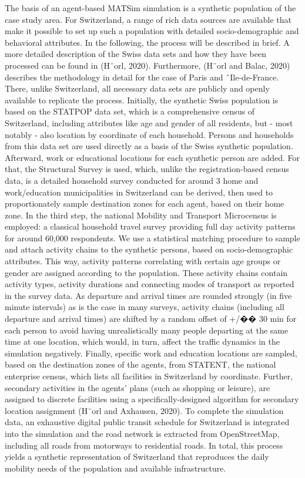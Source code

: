 The basis of an agent-based MATSim simulation is a synthetic population of the case study area. For Switzerland, a range of rich
data sources are available that make it possible to set up such a population with detailed socio-demographic and behavioral attributes.
In the following, the process will be described in brief. A more detailed description of the Swiss data sets and how they have been
processed can be found in (H¨orl, 2020). Furthermore, (H¨orl and Balac, 2020) describes the methodology in detail for the case of Paris
and ˆIle-de-France. There, unlike Switzerland, all necessary data sets are publicly and openly available to replicate the process.
Initially, the synthetic Swiss population is based on the STATPOP data set, which is a comprehensive census of Switzerland,
including attributes like age and gender of all residents, but - most notably - also location by coordinate of each household. Persons and
households from this data set are used directly as a basis of the Swiss synthetic population. Afterward, work or educational locations for
each synthetic person are added. For that, the Structural Survey is used, which, unlike the registration-based census data, is a detailed
household survey conducted for around 3%
home and work/education municipalities in Switzerland can be derived, then used to proportionately sample destination zones for
each agent, based on their home zone. In the third step, the national Mobility and Transport Microcensus is employed: a classical
household travel survey providing full day activity patterns for around 60,000 respondents. We use a statistical matching procedure to
sample and attach activity chains to the synthetic persons, based on socio-demographic attributes. This way, activity patterns
correlating with certain age groups or gender are assigned according to the population. These activity chains contain activity types,
activity durations and connecting modes of transport as reported in the survey data. As departure and arrival times are rounded
strongly (in five minute intervals) as is the case in many surveys, activity chains (including all departure and arrival times) are shifted
by a random offset of +/�� 30 min for each person to avoid having unrealistically many people departing at the same time at one
location, which would, in turn, affect the traffic dynamics in the simulation negatively. Finally, specific work and education locations
are sampled, based on the destination zones of the agents, from STATENT, the national enterprise census, which lists all facilities in
Switzerland by coordinate. Further, secondary activities in the agents’ plans (such as shopping or leisure), are assigned to discrete
facilities using a specifically-designed algorithm for secondary location assignment (H¨orl and Axhausen, 2020). To complete the
simulation data, an exhaustive digital public transit schedule for Switzerland is integrated into the simulation and the road network is
extracted from OpenStreetMap, including all roads from motorways to residential roads. In total, this process yields a synthetic
representation of Switzerland that reproduces the daily mobility needs of the population and available infrastructure.


